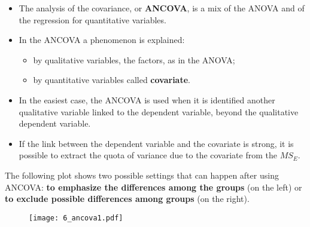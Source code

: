 
\begin{frame}
  \begin{itemize}
    \item The analysis of the covariance, or \textbf{ANCOVA}, is a mix of the ANOVA and of the regression for quantitative variables.
    \vspace{0.2cm}
    \item In the ANCOVA a phenomenon is explained:
    \begin{itemize}
      \item by qualitative variables, the factors, as in the ANOVA;
      \item by quantitative variables called \textbf{covariate}.
    \end{itemize}
    \vspace{0.2cm}
    \item In the easiest case, the ANCOVA is used when it is identified another qualitative variable linked to the dependent variable, beyond the qualitative dependent variable.
    \vspace{0.2cm}
    \item If the link between the dependent variable and the covariate is strong, it is possible to extract the quota of variance due to the covariate from the $ MS_E $.
  \end{itemize}
\end{frame}

\begin{frame}
  The following plot shows two possible settings that can happen after using ANCOVA: \textbf{to emphasize the differences among the groups} (on the left) or \textbf{to exclude possible differences among groups} (on the right).\\
  \vspace{-.65cm}
  \begin{figure}
    \texttt{[image: 6\_ancova1.pdf]}
  \end{figure}
\end{frame}

